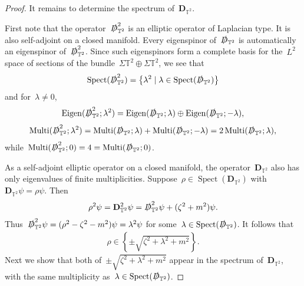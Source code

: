 \documentclass[11pt,final]{amsart}
\newcommand{\T}{\mathbb{T}}
\newcommand{\D}{\slashed{D}}
\newcommand{\pD}{\mathbf{D}}
\newcommand{\braces}[1]{\left\{#1\right\}} %
\DeclareMathOperator{\Eigen}{Eigen}
\DeclareMathOperator{\Mtp}{Multi} %
\DeclareMathOperator{\Spect}{Spect}
\begin{document}
\begin{proof}
    It remains to determine the spectrum of~$\pD_{\T^2}$.

    First note that the operator~$\D_{\T^2}^2$ is an elliptic operator of Laplacian type. 
    It is also self-adjoint on a closed manifold. 
    Every eigenspinor of~$\D_{\T^2}$ is automatically an eigenspinor of~$\D_{\T^2}^2$.
    Since such eigenspinors form a complete basis for the~$L^2$ space of sections of the bundle~$\Sigma\T^2\oplus \Sigma\T^2$, we see that
    \begin{align}
        \Spect(\D_{\T^2}^2)=\braces{\lambda^2 \mid \lambda\in\Spect(\D_{\T^2})}
    \end{align}
    and for~$\lambda\neq 0$, 
    \begin{align}\label{eq:Eigen-lambda2}
        \Eigen(\D_{\T^2}^2;\lambda^2)
        =\Eigen(\D_{\T^2};\lambda)
        \oplus
        \Eigen(\D_{\T^2};-\lambda),
    \end{align}
    \begin{align}
        \Mtp(\D_{\T^2}^2;\lambda^2)
        = \Mtp(\D_{\T^2};\lambda) 
        + \Mtp(\D_{\T^2};-\lambda)
        =2\Mtp(\D_{\T^2};\lambda), 
    \end{align}
    while~$\Mtp(\D_{\T^2}^2;0)=4=\Mtp(\D_{\T^2};0)$.

    As a self-adjoint elliptic operator on a closed manifold, the operator~$\pD_{\T^2}$ also has only eigenvalues of finite multiplicities. 
    Suppose~$\rho\in\Spect(\pD_{\T^2})$ with~$\pD_{\T^2}\psi=\rho\psi$.
    Then 
    \begin{align}
        \rho^2\psi=\pD_{\T^2}^2\psi 
        = \D_{\T^2}^2\psi + (\zeta^2+m^2)\psi. 
    \end{align}
    Thus~$\D_{\T^2}^2\psi= (\rho^2-\zeta^2-m^2)\psi=\lambda^2\psi$ for some~$\lambda\in\Spect(\D_{\T^2})$. 
    It follows that
    \begin{align}
        \rho\in \braces{\pm \sqrt{\zeta^2+\lambda^2+m^2}}. 
    \end{align}
    Next we show that both of~$\pm \sqrt{\zeta^2+\lambda^2+m^2} $ appear in the spectrum of~$\pD_{\T^2}$, with the same multiplicity as~$\lambda\in\Spect(\D_{\T^2})$.


\end{proof}
\end{document}
